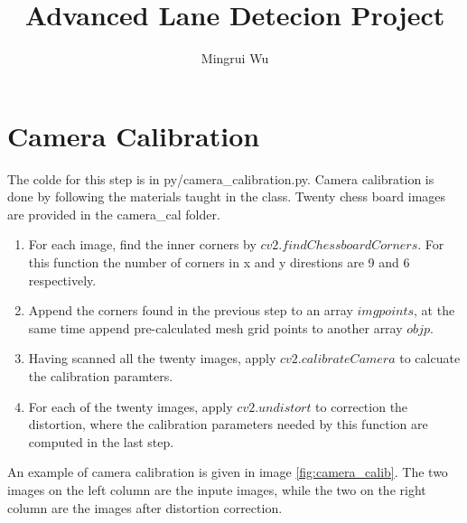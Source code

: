 \documentclass[12pt]{article}
\title{Advanced Lane Detecion Project}
\author{Mingrui Wu}
\date{}
\begin{document}
\maketitle


\section{Camera Calibration}
The colde for this step is in py/camera\_calibration.py. Camera calibration is done by following the materials taught in the class. Twenty chess board images are provided in the camera\_cal folder. 
\begin{enumerate}
	\item For each image, find the inner corners by $cv2.findChessboardCorners$. For this function the number of corners in x and y direstions are 9 and 6 respectively.
	\item Append the corners found in the previous step to an array $imgpoints$, at the same time append pre-calculated mesh grid points to another array $objp$.
	\item Having scanned all the twenty images, apply $cv2.calibrateCamera$ to calcuate the calibration paramters.
	\item For each of the twenty images, apply $cv2.undistort$ to correction the distortion, where the calibration parameters needed by this function are computed in the last step.
\end{enumerate}
	 
An example of camera calibration is given in image \ref{fig:camera_calib}. The two images on the left column are the inpute images, while the two on the right column are the images after distortion correction.
\end{document}
